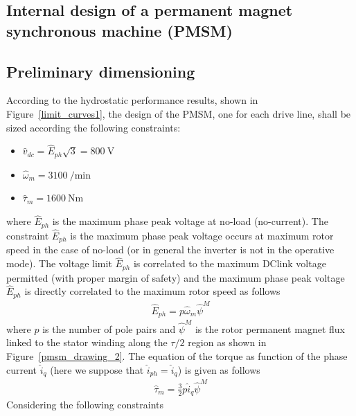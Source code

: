 \documentclass[11pt,a4paper,oneside]{book}
\begin{document}
\begin{onehalfspace}
\chapter{Internal design of a permanent magnet synchronous machine (PMSM)}

\section{Preliminary dimensioning}

According to the hydrostatic performance results, shown in Figure~\ref{limit_curves1}, the design of the PMSM, one for each drive line, shall be sized according the following constraints:\\
\begin{itemize}
	\item $\hat{v}_{dc}=\hat{E}_{ph}\sqrt{3}=\SI{800}{\volt}$   
	\item $\hat{\omega}_{m}=\SI{3100}{\per\minute}$
	\item $\hat{\tau}_{m}=\SI{1600}{\newton\meter}$\\
\end{itemize}
where $\hat{E}_{ph}$ is the maximum phase peak voltage at no-load (no-current).
The constraint $\hat{E}_{ph}$ is the maximum phase peak voltage occurs at maximum rotor speed in the case of no-load (or in general the inverter is not in the operative mode). The voltage limit $\hat{E}_{ph}$ is correlated to the maximum DClink voltage permitted (with proper margin of safety) and the maximum phase peak voltage $\hat{E}_{ph}$ is directly correlated to the maximum rotor speed as follows
\begin{equation}
	\begin{aligned}
		\hat{E}_{ph} = p\hat{\omega}_m\hat{\psi}^M
	\end{aligned}
\end{equation}
where $p$ is the number of pole pairs and $\hat{\psi}^M$ is the rotor permanent magnet flux linked to the stator winding along the $\tau/2$ region as shown in Figure~\ref{pmsm_drawing_2}.
The equation of the torque as function of the phase current $\hat{i}_{q}$ (here we suppose that $\hat{i}_{ph}=\hat{i}_{q}$) is given as follows
\begin{equation}
	\begin{aligned}
		\hat{\tau}_{m} = \frac{3}{2}p\hat{i}_q\hat{\psi}^M
	\end{aligned}
\end{equation}
Considering the following constraints
\begin{itemize}

\end{itemize}
\end{onehalfspace}
\end{document}
